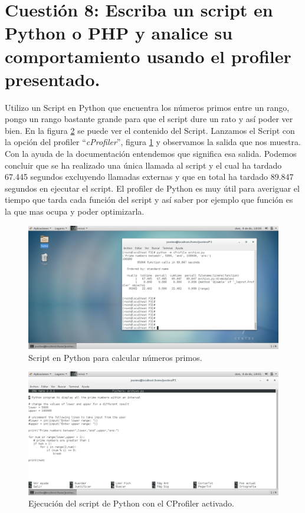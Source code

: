 \section{Cuestión 8: Escriba un script en Python o PHP y analice su comportamiento usando el profiler presentado.}
Utilizo un Script en Python que encuentra los números primos entre un rango, pongo un rango bastante
grande para que el script dure un rato y así poder ver bien. En la figura \ref{fig:P3_8_2} se puede ver
el contenido del Script. Lanzamos el Script con la opción del profiler ``\textit{cProfiler}'', 
figura \ref{fig:P3_8_1} y observamos la salida que nos muestra. Con la ayuda de la 
documentación \cite{CProfiler} entendemos que significa esa salida.
Podemos concluir que se ha realizado una única llamada al script y el cual ha tardado 67.445 segundos
excluyendo llamadas externas y que en total ha tardado 89.847 segundos en ejecutar el script. El
profiler de Python es muy útil para averiguar el tiempo que tarda cada función del script y así 
saber por ejemplo que función es la que mas ocupa y poder optimizarla.



\begin{figure}[H] %
\centering
\includegraphics[scale=0.4]{./imagenes/P3_8_1.png} 
\caption{Script en Python para calcular números primos.} \label{fig:P3_8_1}
\end{figure}

\begin{figure}[H] %
\centering
\includegraphics[scale=0.4]{./imagenes/P3_8_2.png} 
\caption{Ejecución del script de Python con el CProfiler activado.} \label{fig:P3_8_2}
\end{figure}



